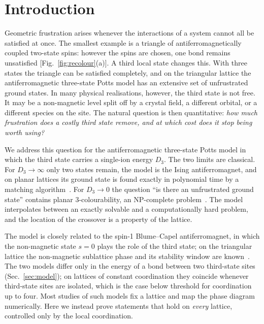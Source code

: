 \documentclass[aps,pre,twocolumn,superscriptaddress,showpacs]{revtex4-2}
\theoremstyle{definition}
\theoremstyle{remark}
\begin{document}
\section{Introduction}
\label{sec:intro}
Geometric frustration arises whenever the interactions of a system cannot all be satisfied at
once. The smallest example is a triangle of antiferromagnetically coupled two-state spins: however
the spins are chosen, one bond remains unsatisfied [Fig.~\ref{fig:recolour}(a)]. A third local state changes this. With three
states the triangle can be satisfied completely, and on the triangular lattice the
antiferromagnetic three-state Potts model has an extensive set of unfrustrated ground states.
In many physical realisations, however, the third state is not free. It may be a non-magnetic
level split off by a crystal field, a different orbital, or a different species on the site.
The natural question is then quantitative: \emph{how much frustration does a costly third state
remove, and at which cost does it stop being worth using?}

We address this question for the antiferromagnetic three-state Potts model in which the third
state carries a single-ion energy $D_3$. The two limits are classical. For $D_3\to\infty$ only
two states remain, the model is the Ising antiferromagnet, and on planar lattices its ground state
is found exactly in polynomial time by a matching algorithm~\cite{Hadlock1975,Bieche1980,Barahona1982}.
For $D_3\to0$ the question ``is there an unfrustrated ground state'' contains planar
3-colourability, an NP-complete problem~\cite{GareyJohnsonStockmeyer1976}. The model interpolates
between an exactly solvable and a computationally hard problem, and the location of the crossover
is a property of the lattice.

The model is closely related to the spin-1 Blume--Capel antiferromagnet, in which the
non-magnetic state $s=0$ plays the role of the third state; on the triangular lattice the
non-magnetic sublattice phase and its stability window are known~\cite{Zukovic2013}. The
two models differ only in the energy of a bond between two third-state sites
(Sec.~\ref{sec:model}); on lattices of constant coordination they coincide whenever third-state
sites are isolated, which is the case below threshold for coordination up to four. Most studies of such models fix a lattice and map the phase diagram
numerically. Here we instead prove statements that hold on \emph{every} lattice, controlled only
by the local coordination.
\end{document}
